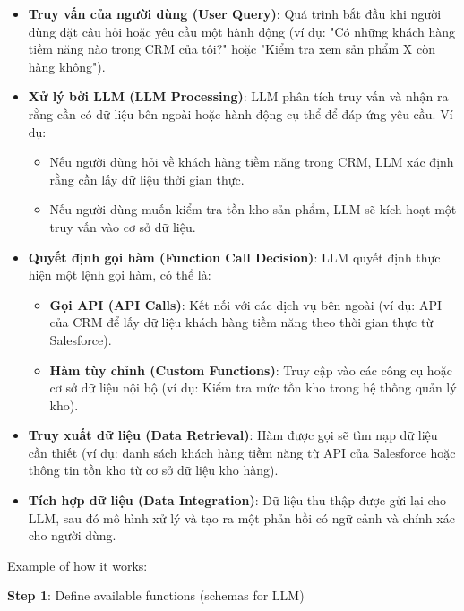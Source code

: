 \documentclass[final,letterpaper,twoside,12pt]{report}
\begin{document}
\begin{itemize}
	\item \textbf{Truy vấn của người dùng (User Query)}: Quá trình bắt đầu khi người dùng đặt câu hỏi hoặc yêu cầu một hành động (ví dụ: "Có những khách hàng tiềm năng nào trong CRM của tôi?" hoặc "Kiểm tra xem sản phẩm X còn hàng không").

	\item \textbf{Xử lý bởi LLM (LLM Processing)}: LLM phân tích truy vấn và nhận ra rằng cần có dữ liệu bên ngoài hoặc hành động cụ thể để đáp ứng yêu cầu. Ví dụ:
	      \begin{itemize}
		      \item Nếu người dùng hỏi về khách hàng tiềm năng trong CRM, LLM xác định rằng cần lấy dữ liệu thời gian thực.
		      \item Nếu người dùng muốn kiểm tra tồn kho sản phẩm, LLM sẽ kích hoạt một truy vấn vào cơ sở dữ liệu.
	      \end{itemize}

	\item \textbf{Quyết định gọi hàm (Function Call Decision)}: LLM quyết định thực hiện một lệnh gọi hàm, có thể là:
	      \begin{itemize}
		      \item \textbf{Gọi API (API Calls)}: Kết nối với các dịch vụ bên ngoài (ví dụ: API của CRM để lấy dữ liệu khách hàng tiềm năng theo thời gian thực từ Salesforce).
		      \item \textbf{Hàm tùy chỉnh (Custom Functions)}: Truy cập vào các công cụ hoặc cơ sở dữ liệu nội bộ (ví dụ: Kiểm tra mức tồn kho trong hệ thống quản lý kho).
	      \end{itemize}

	\item \textbf{Truy xuất dữ liệu (Data Retrieval)}: Hàm được gọi sẽ tìm nạp dữ liệu cần thiết (ví dụ: danh sách khách hàng tiềm năng từ API của Salesforce hoặc thông tin tồn kho từ cơ sở dữ liệu kho hàng).

	\item \textbf{Tích hợp dữ liệu (Data Integration)}: Dữ liệu thu thập được gửi lại cho LLM, sau đó mô hình xử lý và tạo ra một phản hồi có ngữ cảnh và chính xác cho người dùng.
\end{itemize}

\newpage

Example of how it works:

\textbf{Step 1}: Define available functions (schemas for LLM)
\end{document}
